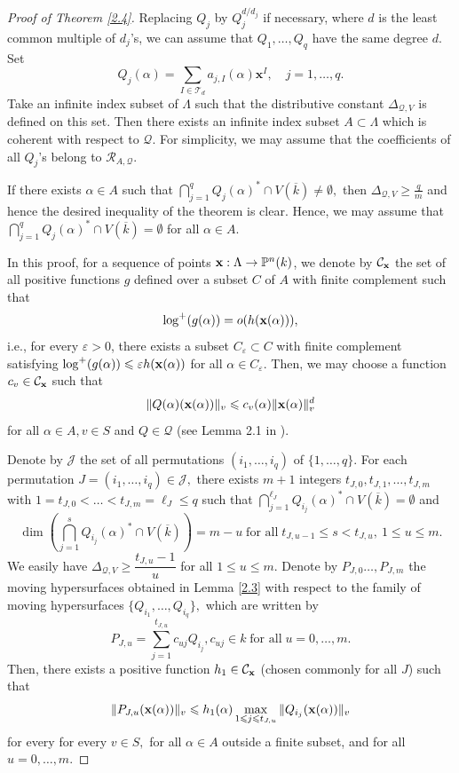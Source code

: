 \documentclass[12pt,leqno]{amsart}
\renewcommand{\P}{{\mathbb{P}}}
\numberwithin{equation}{section}
\begin{document}
\begin{proof}[Proof of Theorem \ref{2.4}]
Replacing $Q_{j}$ by $Q_{j}^{d / d_{j}}$ if necessary, where $d$ is the least common multiple of $d_{j}$'s, we can assume that $Q_{1}, \ldots, Q_{q}$ have the same degree $d$. Set
$$Q_{j}(\alpha)=\sum_{I \in \mathcal{T}_d} a_{j, I}(\alpha) \mathbf{x}^{I}, \quad j=1, \ldots, q.$$
Take an infinite index subset of $\Lambda$ such that the distributive constant $\Delta_{\mathcal Q,V}$ is defined on this set. 
Then there exists an infinite index subset $A\subset \Lambda$ which is coherent with respect to $\mathcal Q.$ For simplicity, we may assume that the coefficients of all $Q_j$'s belong to $\mathcal R_{A, \mathcal Q}.$  

If there exists $\alpha\in A$ such that $\bigcap_{j=1}^{q}Q_j(\alpha)^*\cap V(\overline k)\ne \emptyset,$ then $\Delta_{\mathcal Q,V}\ge \frac{q}{m}$
and hence the desired inequality of the theorem is clear. Hence, we may assume that $\bigcap_{j=1}^{q}Q_j(\alpha)^*\cap V(\overline k)=\emptyset$ for all $\alpha\in A.$ 

In this proof, for a sequence of points ${\bf x}:\Lambda\rightarrow\P^n(k)$, we denote by $\mathcal C_{\bf x}$ the set of all positive functions $g$ defined over a subset $C$ of $A$ with finite complement such that
$$ \log^{+}(g(\alpha)) =o(h({\bf x}(\alpha))),$$
i.e., for every $\varepsilon >0$, there exists a subset $C_{\varepsilon}\subset C$ with finite complement satisfying $\log^{+}(g(\alpha))\leqslant \varepsilon h({\bf x}(\alpha))$ for all $\alpha \in C_{\varepsilon}.$ Then, we may choose a function $c_v\in \mathcal C_{\bf x}$ such that
$$ \|Q(\alpha)({\bf x(\alpha)})\|_v\leqslant c_v(\alpha)\|{\bf{x}(\alpha)}\|_v^{d}$$
for all $\alpha\in A,v\in S$ and $Q\in\mathcal Q$ (see Lemma 2.1 in \cite{CQT}).

Denote by $\mathcal J$ the set of all permutations $(i_1,\ldots,i_q)$ of $\{1,\ldots,q\}$. For each permutation $J=(i_1,\dots, i_q)\in \mathcal J,$ there exists $m+1$ integers $t_{J,0}, t_{J,1},\dots, t_{J,m}$ with
$1=t_{J,0}<\dots<t_{J,m}=\ell_J\leqslant q$ such that $\bigcap_{j=1}^{\ell_J}Q_{i_j}(\alpha)^*\cap V(\overline k)=\emptyset$ and
$$\dim\left(\bigcap_{j=1}^{s}Q_{i_j}(\alpha)^*\cap V(\overline k)\right)=m-u\; \text{for all}\; t_{J,u-1}\leqslant s<t_{J,u},\ 1\leqslant u\leqslant m.$$
We easily have $\Delta_{\mathcal Q,V}\geqslant\dfrac{t_{J,u}-1}{u}$ for all $1\leqslant u\leqslant m.$ Denote by $P_{J, 0}\dots, P_{J,m}$ the 
moving hypersurfaces obtained in Lemma \ref{2.3} with respect to the family of moving hypersurfaces $\{Q_{i_1}, \dots, Q_{i_q}\},$ which are written by
$$P_{J,u}=\sum_{j=1}^{t_{J,u}}c_{uj}Q_{i_j}, c_{uj}\in k\; \text{for all}\; u=0,\dots, m.$$
Then, there exists a positive function $h_1\in \mathcal C_{\bf x}$ (chosen commonly for all $J$) such that
$$\|P_{J, u}({\bf x}(\alpha))\|_v\leqslant h_1(\alpha)\max_{1\leqslant j\leqslant t_{J,u}}\|Q_{i_j}({\bf x}(\alpha))\|_v$$
for every for every $v\in S,$ for all $\alpha\in A$ outside a finite subset, and for all $u=0,\dots,m.$ 


\end{proof}
\end{document}
